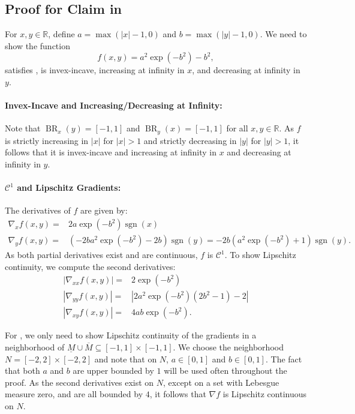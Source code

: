 \documentclass{article}
\newcommand{\R}{\mathbb{R}}
\DeclareMathOperator{\BR}{BR}
\DeclareMathOperator{\sgn}{sgn}
\begin{document}
\subsection{Proof for Claim in }
\label{sec:proof:ex:localPLconnected}
 For $x,y \in \R$, define $a = \max\left(|x| - 1, 0\right)$ and $b = \max\left(|y| - 1, 0\right)$. We need to show the function 
    \[
        f(x,y)= a^2 \exp\left(-b^2\right) - b^2,
    \]
satisfies , is invex-incave, increasing at infinity in $x$, and decreasing at infinity in $y$. 

\paragraph{Invex-Incave and Increasing/Decreasing at Infinity:} 
Note that $\BR_x(y)=[-1,1]$ and $\BR_y(x)=[-1,1]$ for all $x,y\in \R$. As $f$ is strictly increasing in $|x|$ for $|x|>1$ and strictly decreasing in $|y|$ for $|y|>1$, it follows that it is invex-incave and increasing at infinity in $x$ and decreasing at infinity in $y$.

\paragraph{$\mathcal{C}^1$ and Lipschitz Gradients:} The derivatives of $f$ are given by:
\begin{align*}
    \nabla_x f(x,y) = & 2a \exp\left(-b^2\right) \sgn(x)\\
    \nabla_y f(x,y) = & \left(-2b a^2 \exp\left(-b^2\right) - 2b \right)\sgn(y)= -2b\left(a^2 \exp\left(-b^2\right) + 1\right)\sgn(y).
\end{align*}
As both partial derivatives exist and are continuous, $f$ is $\mathcal{C}^1$. To show Lipschitz continuity, we compute the second derivatives:
\begin{align*}
    |\nabla_{xx} f(x,y)| = & 2 \exp\left(-b^2\right) \\
    |\nabla_{yy} f(x,y)| = & \left|2a^2 \exp\left(-b^2\right) \left(2b^2 - 1\right) -2\right|\\
    |\nabla_{xy} f(x,y)| = & 4ab \exp\left(-b^2\right).
    \end{align*}

For , we only need to show Lipschitz continuity of the gradients in a neighborhood of $\underline{M}\cup \overline{M}\subseteq[-1,1]\times[-1,1]$. We choose the neighborhood $N=[-2,2]\times[-2,2]$ and note that on $N$, $a\in [0,1]$ and $b\in [0,1]$. The fact that both $a$ and $b$ are upper bounded by $1$ will be used often throughout the proof. As the second derivatives exist on $N$, except on a set with Lebesgue measure zero, and are all bounded by $4$, it follows that $\nabla f$ is Lipschitz continuous on $N$.
\end{document}
